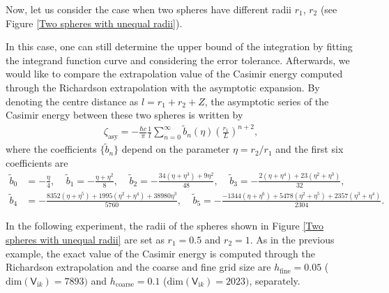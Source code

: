 Now, let us consider the case when two spheres have different radii $r_{1}$, $r_{2}$ (see Figure \ref{Two spheres with unequal radii}). 

In this case, one can still determine the upper bound of the integration by fitting the integrand function curve and considering the error tolerance.
Afterwards, we would like to compare the extrapolation value of the Casimir energy computed through the Richardson extrapolation with the asymptotic expansion. By denoting the centre distance as
$l = r_{1} + r_{2} + Z$, the asymptotic series of the Casimir energy between these two spheres is written by
\begin{align}\label{Asymptotic unequal radii}
    \zeta_{\text{asy}} = -\frac{\hbar c}{\pi}\frac{1}{l}\sum_{n=0}^{\infty}\tilde{b}_{n}(\eta)\left(\frac{r_{1}}{L}\right)^{n+2},
\end{align}
where the coefficients $\{\tilde{b}_{n}\}$ depend on the parameter $\eta = r_{2}/r_{1}$ and the first six coefficients are
\begin{align*}
    \tilde{b}_{0} &= -\frac{\eta}{4}, \ \ \ \ \ \tilde{b}_{1} = -\frac{\eta + \eta^{2}}{8}, \ \ \ \ \  \tilde{b}_{2} = -\frac{34(\eta+\eta^{3})+ 9\eta^{2}}{48}, \ \ \ \ \ \tilde{b}_{3} = -\frac{2(\eta+\eta^{4}) + 23(\eta^{2} + \eta^{3})}{32}, \\ 
    \tilde{b}_{4} &= -\frac{8352(\eta + \eta^{5})+ 1995(\eta^{2} + \eta^{4}) + 38980\eta^{3}}{5760}, \ \ \ \ \ \tilde{b}_{5} = -\frac{-1344(\eta+\eta^{6}) + 5478(\eta^{2} + \eta^{5})+2357(\eta^{3} + \eta^{4})}{2304}.
\end{align*}

In the following experiment, the radii of the spheres shown in Figure \ref{Two spheres with unequal radii} are set as $r_{1} = 0.5$ and $ r_{2} = 1$. 
As in the previous example, the exact value of the Casimir energy is computed through the Richardson extrapolation and the coarse and fine grid size are $h_{\text{fine}} = 0.05$ ($\text{dim}(\mathsf{V}_{\mathrm{i}k}) = 7893)$ and 
$h_{\text{coarse}} = 0.1$ ($\text{dim}(\mathsf{V}_{\mathrm{i}k}) = 2023)$, separately. 

